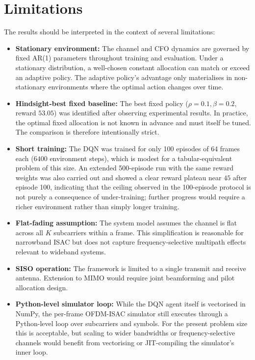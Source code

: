 \section{Limitations}

The results should be interpreted in the context of several limitations:

\begin{itemize}
    \item \textbf{Stationary environment:} The channel and CFO dynamics are governed by fixed AR(1) parameters throughout training and evaluation. Under a stationary distribution, a well-chosen constant allocation can match or exceed an adaptive policy. The adaptive policy's advantage only materialises in non-stationary environments where the optimal action changes over time.

    \item \textbf{Hindsight-best fixed baseline:} The best fixed policy ($\rho{=}0.1, \beta{=}0.2$, reward $53.05$) was identified after observing experimental results. In practice, the optimal fixed allocation is not known in advance and must itself be tuned. The comparison is therefore intentionally strict.

    \item \textbf{Short training:} The DQN was trained for only 100 episodes of 64 frames each ($6400$ environment steps), which is modest for a tabular-equivalent problem of this size. An extended 500-episode run with the same reward weights was also carried out and showed a clear reward plateau near $45$ after episode 100, indicating that the ceiling observed in the 100-episode protocol is not purely a consequence of under-training; further progress would require a richer environment rather than simply longer training.

    \item \textbf{Flat-fading assumption:} The system model assumes the channel is flat across all $K$ subcarriers within a frame. This simplification is reasonable for narrowband ISAC but does not capture frequency-selective multipath effects relevant to wideband systems.

    \item \textbf{SISO operation:} The framework is limited to a single transmit and receive antenna. Extension to MIMO would require joint beamforming and pilot allocation design.

    \item \textbf{Python-level simulator loop:} While the DQN agent itself is vectorised in NumPy, the per-frame OFDM-ISAC simulator still executes through a Python-level loop over subcarriers and symbols. For the present problem size this is acceptable, but scaling to wider bandwidths or frequency-selective channels would benefit from vectorising or JIT-compiling the simulator's inner loop.
\end{itemize}


